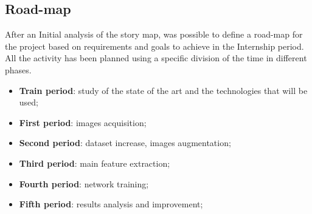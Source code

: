 \subsection{Road-map}
After an Initial analysis of the story map, was possible to define a road-map for the project based on requirements and goals to achieve in the Internship period.
All the activity has been planned using a specific division of the time in different phases.
\begin{itemize}
    \item \textbf{Train period}: study of the state of the art and the technologies that will be used;
    \item \textbf{First period}: images acquisition;
    \item \textbf{Second period}: dataset increase, images augmentation;
    \item \textbf{Third period}: main feature extraction;
    \item \textbf{Fourth period}: network training;
    \item \textbf{Fifth period}: results analysis and improvement;
\end{itemize}
